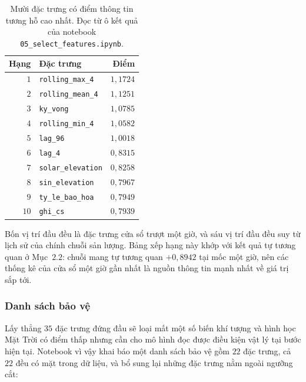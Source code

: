 \documentclass[12pt, a4paper]{report}
\begin{document}
\begin{table}[htbp]
\centering
\caption{Mười đặc trưng có điểm thông tin tương hỗ cao nhất. Đọc từ ô kết quả của notebook
\texttt{05\_select\_features.ipynb}.}
\label{tab:mi}
\small
\begin{tabular}{r l r}
\toprule
\textbf{Hạng} & \textbf{Đặc trưng} & \textbf{Điểm} \\
\midrule
$1$  & \texttt{rolling\_max\_4}   & $1{,}1724$ \\
$2$  & \texttt{rolling\_mean\_4}  & $1{,}1251$ \\
$3$  & \texttt{ky\_vong}         & $1{,}0785$ \\
$4$  & \texttt{rolling\_min\_4}   & $1{,}0582$ \\
$5$  & \texttt{lag\_96}          & $1{,}0018$ \\
$6$  & \texttt{lag\_4}           & $0{,}8315$ \\
$7$  & \texttt{solar\_elevation} & $0{,}8258$ \\
$8$  & \texttt{sin\_elevation}   & $0{,}7967$ \\
$9$  & \texttt{ty\_le\_bao\_hoa}   & $0{,}7949$ \\
$10$ & \texttt{ghi\_cs}          & $0{,}7939$ \\
\bottomrule
\end{tabular}
\end{table}

Bốn vị trí đầu đều là đặc trưng cửa sổ trượt một giờ, và sáu vị trí đầu đều suy từ lịch sử của
chính chuỗi sản lượng. Bảng xếp hạng này khớp với kết quả tự tương quan ở Mục~$2.2$: chuỗi mang
tự tương quan $+0{,}8942$ tại mốc một giờ, nên các thống kê của cửa sổ một giờ gần nhất là nguồn
thông tin mạnh nhất về giá trị sắp tới.

\subsubsection{Danh sách bảo vệ}

Lấy thẳng $35$ đặc trưng đứng đầu sẽ loại mất một số biến khí tượng và hình học Mặt Trời có điểm
thấp nhưng cần cho mô hình đọc được điều kiện vật lý tại bước hiện tại. Notebook vì vậy khai báo
một danh sách bảo vệ gồm $22$ đặc trưng, cả $22$ đều có mặt trong dữ liệu, và bổ sung lại những
đặc trưng nằm ngoài ngưỡng cắt:
\end{document}
